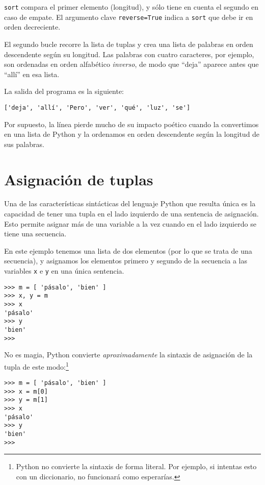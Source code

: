 {\tt sort} compara el primer elemento (longitud), y
sólo tiene en cuenta el segundo en caso de empate. El argumento
clave {\tt reverse=True} indica a {\tt sort} que debe ir en orden decreciente.


El segundo bucle recorre la lista de tuplas y crea una lista de
palabras en orden descendente según su longitud. Las palabras con cuatro caracteres,
por ejemplo, son ordenadas en orden alfabético {\em inverso}, de modo que
``deja'' aparece antes que ``allí'' en esa lista.

La salida del programa es la siguiente:
%
\beforeverb
\begin{verbatim}
['deja', 'allí', 'Pero', 'ver', 'qué', 'luz', 'se']
\end{verbatim}
\afterverb
%
Por supuesto, la línea pierde mucho de su impacto poético
cuando la convertimos en una lista de Python y la ordenamos
en orden descendente según la longitud de sus palabras.

\section{Asignación de tuplas}
\label{tuple assignment}


Una de las características sintácticas del lenguaje Python que resulta única
es la capacidad de tener una tupla en el lado
izquierdo de una sentencia de asignación. Esto permite asignar
más de una variable a la vez cuando en el lado izquierdo se tiene
una secuencia.

En este ejemplo tenemos una lista de dos elementos (por lo que se trata de una secuencia), y
asignamos los elementos primero y segundo de la secuencia
a las variables {\tt x} e {\tt y} en una única sentencia.

\beforeverb
\begin{verbatim}
>>> m = [ 'pásalo', 'bien' ]
>>> x, y = m
>>> x
'pásalo'
>>> y
'bien'
>>> 
\end{verbatim}
\afterverb
%
No es magia, Python convierte \emph{aproximadamente} la
sintaxis de asignación de la tupla
de este modo:\footnote{Python no convierte la
sintaxis de forma literal. Por ejemplo, si intentas esto con un diccionario,
no funcionará como esperarías.}

\beforeverb
\begin{verbatim}
>>> m = [ 'pásalo', 'bien' ]
>>> x = m[0]
>>> y = m[1]
>>> x
'pásalo'
>>> y
'bien'
>>> 
\end{verbatim}
\afterverb

